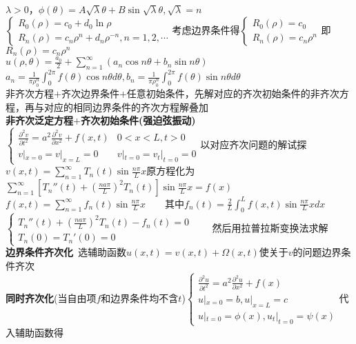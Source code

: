 \documentclass[10pt,a4paper]{article}
\begin{document}
\begin{multicols}{2}
$\lambda>0$，$\phi(\theta)=A\sqrt{\lambda}\theta+B\sin\sqrt{\lambda}\theta,\sqrt{\lambda}=n$\\
\indent$\left\{\begin{array}{l}R_0(\rho)=c_0+d_0\ln\rho\\R_n(\rho)=c_n\rho^n+d_n\rho^{-n},n=1,2,\cdots\end{array}\right.$考虑边界条件得$\left\{\begin{array}{l}R_0(\rho)=c_0\\R_n(\rho)=c_n\rho^n\end{array}\right.$即$R_n(\rho)=c_n\rho^n$\\
$u(\rho,\theta)=\frac{a_0}{2}+\sum_{n=1}^{\infty}(a_n\cos n\theta+b_n\sin n\theta)$\\
$a_n=\frac{1}{\pi\rho_0^n}\int_0^{2\pi}f(\theta)\cos n\theta d\theta,b_n=\frac{1}{\pi\rho_0^n}\int_0^{2\pi}f(\theta)\sin n\theta d\theta$\\
非齐次方程$+$齐次边界条件$+$任意初始条件，先解对应的齐次初始条件的非齐次方程，再与对应的相同边界条件的齐次方程解叠加\\
\textbf{非齐次泛定方程$+$齐次初始条件(强迫弦振动)}$\left\{\begin{array}{ll}\frac{\partial^2v}{\partial t^2}=a^2\frac{\partial^2v}{\partial x^2}+f(x,t)&0<x<L,t>0\\v|_{x=0}=v|_{x=L}=0&v|_{t=0}=v_t|_{t=0}=0\end{array}\right.$以对应齐次问题的解试探$v(x,t)=\sum_{n=1}^{\infty}T_n(t)\sin\frac{n\pi}{L}x$原方程化为$\sum_{n=1}^{\infty}[T_n''(t)+(\frac{na\pi}{L})^2T_n(t)]\sin\frac{n\pi}{L}x=f(x)$\\
$f(x,t)=\sum_{n=1}^{\infty}f_n(t)\sin\frac{n\pi}{L}x$~~~~其中$f_n(t)=\frac{2}{L}\int_0^Lf(x,t)\sin\frac{n\pi}{L}xdx$\\
$\left\{\begin{array}{l}T_n''(t)+(\frac{na\pi}{L})^2T_n(t)-f_n(t)=0\\T_n(0)=T_n'(0)=0\end{array}\right.$~~~~然后用拉普拉斯变换法求解\scriptsize\\
\textbf{边界条件齐次化}~选辅助函数$u(x,t)=v(x,t)+\Omega(x,t)$使关于$v$的问题边界条件齐次\\
\tiny\textbf{同时齐次化}(当自由项$f$和边界条件均不含$t$)$\left\{\begin{array}{l}\frac{\partial^2u}{\partial t^2}=a^2\frac{\partial^2u}{\partial x^2}+f(x)\\u|_{x=0}=b,u|_{x=L}=c\\u|_{t=0}=\phi(x),u_t|_{t=0}=\psi(x)\end{array}\right.$代入辅助函数得\\

\end{multicols}
\end{document}
